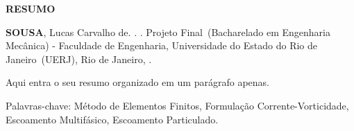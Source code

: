 \begin{center}
\textbf{RESUMO}
\end{center}

%
%

$\!$\\

\hspace{-1.3cm}\textbf{SOUSA}, Lucas Carvalho de. \textit{\mainTitle}. \numPages. Projeto Final~(Bacharelado em Engenharia Mecânica) - Faculdade de Engenharia, Universidade do Estado do Rio de Janeiro~(UERJ), Rio de Janeiro, \curYear.

\vspace{.2cm}

Aqui entra o seu resumo organizado em um parágrafo apenas.

\vspace{1cm}

\hspace{-1.3cm}Palavras-chave: Método de Elementos Finitos, Formulação Corrente-Vorticidade, Escoamento Multifásico, Escoamento Particulado.